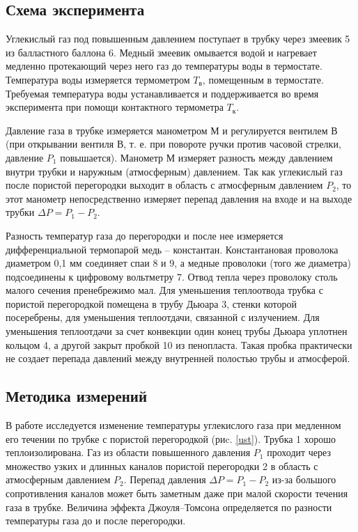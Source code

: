 \documentclass[12pt,a4paper]{article}
\begin{document}
\subsection{Схема эксперимента}


Углекислый газ под повышенным давлением поступает в трубку через змеевик 5 из балластного баллона 6. Медный змеевик омывается водой и нагревает медленно протекающий через него газ до температуры воды в термостате. Температура воды измеряется термометром $ T_\text{в} $, помещенным в термостате. Требуемая температура воды устанавливается и поддерживается во время эксперимента при помощи контактного термометра $ T_\text{к} $.

Давление газа в трубке измеряется манометром М и регулируется вентилем В (при открывании вентиля В, т. е. при повороте ручки против часовой стрелки, давление $ P_1 $ повышается). Манометр М измеряет разность между давлением внутри трубки и наружным (атмосферным) давлением. Так как углекислый газ после пористой перегородки выходит в область с атмосферным давлением $ P_2 $, то этот манометр непосредственно измеряет перепад давления на входе и на выходе трубки $ \Delta P = P_1 - P_2 $.

Разность температур газа до перегородки и после нее измеряется дифференциальной термопарой медь -- константан. Константановая проволока диаметром 0,1 мм соединяет спаи 8 и 9, а медные проволоки (того же диаметра) подсоединены к цифровому вольтметру 7. Отвод тепла через проволоку столь малого сечения пренебрежимо мал. Для уменьшения теплоотвода трубка с пористой перегородкой помещена в трубу Дьюара 3, стенки которой посеребрены, для уменьшения теплоотдачи, связанной с излучением. Для уменьшения теплоотдачи за счет конвекции один конец трубы Дьюара уплотнен кольцом 4, а другой закрыт пробкой 10 из пенопласта. Такая пробка практически не создает перепада давлений между внутренней полостью трубы и атмосферой.

\subsection{Методика измерений}

В работе исследуется изменение температуры углекислого газа при медленном его течении по трубке с пористой перегородкой (риc. \ref{ust}). Трубка 1 хорошо теплоизолирована. Газ из области повышенного давления $ P_1 $ проходит через множество узких и длинных каналов пористой перегородки 2 в область с атмосферным давлением $ P_2 $. Перепад давления $ \Delta P = P_1 - P_2 $ из-за большого сопротивления каналов может быть заметным даже при малой скорости течения газа в трубке. Величина эффекта Джоуля–Томсона определяется по разности температуры газа до и после перегородки.
\end{document}
